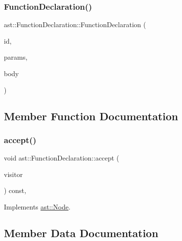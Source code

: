 \subsubsection{\texorpdfstring{Function\+Declaration()}{FunctionDeclaration()}}
{\footnotesize\ttfamily ast\+::\+Function\+Declaration\+::\+Function\+Declaration (\begin{DoxyParamCaption}\item[{\hyperlink{structast_1_1_identifier}{Identifier} $\ast$}]{id,  }\item[{\hyperlink{structast_1_1_formal_parameter_list}{Formal\+Parameter\+List} $\ast$}]{params,  }\item[{\hyperlink{structast_1_1_function_body}{Function\+Body} $\ast$}]{body }\end{DoxyParamCaption})\hspace{0.3cm}{\ttfamily [inline]}}



\subsection{Member Function Documentation}
\mbox{\label{structast_1_1_function_declaration_a870a888ed05b4fbe6e724652ae2c6442}} 
\subsubsection{\texorpdfstring{accept()}{accept()}}
{\footnotesize\ttfamily void ast\+::\+Function\+Declaration\+::accept (\begin{DoxyParamCaption}\item[{\hyperlink{structast_1_1_visitor}{Visitor} \&}]{visitor }\end{DoxyParamCaption}) const\hspace{0.3cm}{\ttfamily [inline]}, {\ttfamily [virtual]}}



Implements \hyperlink{structast_1_1_node_abc089ee6caaf06a4445ebdd8391fdebc}{ast\+::\+Node}.



\subsection{Member Data Documentation}
\mbox{\label{structast_1_1_function_declaration_a35686e34a8dc7de03745a0e8890b7bf4}} 
